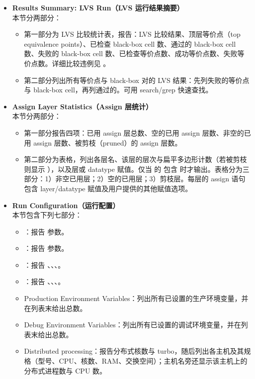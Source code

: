 \begin{itemize}
  \item \textbf{Results Summary: LVS Run（LVS 运行结果摘要）}\\
  本节分两部分：
  \begin{itemize}
    \item 第一部分为 LVS 比较统计表，报告：LVS 比较结果、顶层等价点（top equivalence points）、已检查 black-box cell 数、通过的 black-box cell 数、失败的 black-box cell 数、已检查等价点数、成功等价点数、失败等价点数。详细比较违例见 。
    \item 第二部分列出所有等价点与 black-box 对的 LVS 结果：先列失败的等价点与 black-box cell，再列通过的。可用 search/grep 快速查找。
  \end{itemize}

  \item \textbf{Assign Layer Statistics（Assign 层统计）}\\
  本节分两部分：
  \begin{itemize}
    \item 第一部分报告四项：已用 assign 层总数、空的已用 assign 层数、非空的已用 assign 层数、被剪枝（pruned）的 assign 层数。
    \item 第二部分为表格，列出各层名、该层的层次与扁平多边形计数（若被剪枝则显示 ），以及层或 datatype 赋值。仅当  的  包含  时才输出。表格分为三部分：1）非空已用层；2）空的已用层；3）剪枝层。每层的 assign 语句包含 layer/datatype 赋值及用户提供的其他赋值选项。
  \end{itemize}

  \item \textbf{Run Configuration（运行配置）}\\
  本节包含下列七部分：
  \begin{itemize}
    \item {}：报告  参数。
    \item {}：报告  参数。
    \item {}：报告 、、、。
    \item {}：报告 、、、。
    \item Production Environment Variables：列出所有已设置的生产环境变量，并在列表末给出总数。
    \item Debug Environment Variables：列出所有已设置的调试环境变量，并在列表末给出总数。
    \item Distributed processing：报告分布式核数与 turbo，随后列出各主机及其规格（型号、CPU、核数、RAM、交换空间）；主机名旁还显示该主机上的分布式进程数与 CPU 数。
  \end{itemize}


\end{itemize}
